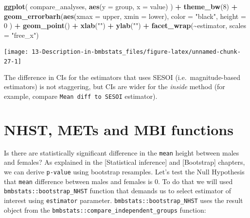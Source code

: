 \documentclass[
]{book}
\newenvironment{Shaded}{\begin{snugshade}}{\end{snugshade}}
\newcommand{\DataTypeTok}[1]{\textcolor[rgb]{0.13,0.29,0.53}{#1}}
\newcommand{\DecValTok}[1]{\textcolor[rgb]{0.00,0.00,0.81}{#1}}
\newcommand{\KeywordTok}[1]{\textcolor[rgb]{0.13,0.29,0.53}{\textbf{#1}}}
\newcommand{\NormalTok}[1]{#1}
\newcommand{\OperatorTok}[1]{\textcolor[rgb]{0.81,0.36,0.00}{\textbf{#1}}}
\newcommand{\StringTok}[1]{\textcolor[rgb]{0.31,0.60,0.02}{#1}}
\begin{document}
\begin{Shaded}
\begin{Highlighting}[]
\KeywordTok{ggplot}\NormalTok{(}
\NormalTok{  compare\_analyses,}
  \KeywordTok{aes}\NormalTok{(}\DataTypeTok{y =}\NormalTok{ group, }\DataTypeTok{x =}\NormalTok{ value)}
\NormalTok{) }\OperatorTok{+}
\StringTok{  }\KeywordTok{theme\_bw}\NormalTok{(}\DecValTok{8}\NormalTok{) }\OperatorTok{+}
\StringTok{  }\KeywordTok{geom\_errorbarh}\NormalTok{(}\KeywordTok{aes}\NormalTok{(}\DataTypeTok{xmax =}\NormalTok{ upper, }\DataTypeTok{xmin =}\NormalTok{ lower),}
    \DataTypeTok{color =} \StringTok{"black"}\NormalTok{,}
    \DataTypeTok{height =} \DecValTok{0}
\NormalTok{  ) }\OperatorTok{+}
\StringTok{  }\KeywordTok{geom\_point}\NormalTok{() }\OperatorTok{+}
\StringTok{  }\KeywordTok{xlab}\NormalTok{(}\StringTok{""}\NormalTok{) }\OperatorTok{+}
\StringTok{  }\KeywordTok{ylab}\NormalTok{(}\StringTok{""}\NormalTok{) }\OperatorTok{+}
\StringTok{  }\KeywordTok{facet\_wrap}\NormalTok{(}\OperatorTok{\textasciitilde{}}\NormalTok{estimator, }\DataTypeTok{scales =} \StringTok{"free\_x"}\NormalTok{)}
\end{Highlighting}
\end{Shaded}

\begin{center}\texttt{[image: 13-Description-in-bmbstats\_files/figure-latex/unnamed-chunk-27-1]} \end{center}

The difference in CIs for the estimators that uses SESOI (i.e.~magnitude-based estimators) is not staggering, but CIs are wider for the \emph{inside} method (for example, compare \texttt{Mean\ diff\ to\ SESOI} estimator).

\hypertarget{nhst-mets-and-mbi-functions}{%
\section{NHST, METs and MBI functions}\label{nhst-mets-and-mbi-functions}}

Is there are statistically significant difference in the \texttt{mean} height between males and females? As explained in the {[}Statistical inference{]} and {[}Bootstrap{]} chapters, we can derive \texttt{p-value} using bootstrap resamples. Let's test the Null Hypothesis that \texttt{mean} difference between males and females is 0. To do that we will used \texttt{bmbstats::bootstrap\_NHST} function that demands us to select estimator of interest using \texttt{estimator} parameter. \texttt{bmbstats::bootstrap\_NHST} uses the result object from the \texttt{bmbstats::compare\_independent\_groups} function:
\end{document}
